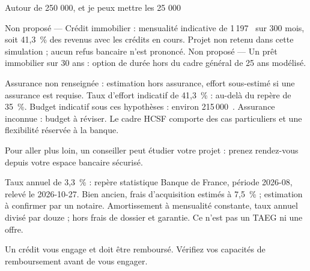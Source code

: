 \documentclass[11pt,a4paper]{article}
\begin{document}
\begin{client}Autour de 250 000, et je peux mettre les 25 000\end{client}
\begin{assistant}Non proposé — Crédit immobilier : mensualité indicative de 1\,197~\texteuro{} sur 300 mois, soit 41,3~\% des revenus avec les crédits en cours. Projet non retenu dans cette simulation ; aucun refus bancaire n'est prononcé. Non proposé — Un prêt immobilier sur 30 ans : option de durée hors du cadre général de 25 ans modélisé.\par Assurance non renseignée : estimation hors assurance, effort sous-estimé si une assurance est requise. Taux d'effort indicatif de 41,3~\% : au-delà du repère de 35~\%. Budget indicatif sous ces hypothèses : environ 215\,000~\texteuro{}. Assurance inconnue : budget à réviser. Le cadre HCSF comporte des cas particuliers et une flexibilité réservée à la banque.\par Pour aller plus loin, un conseiller peut étudier votre projet : prenez rendez-vous depuis votre espace bancaire sécurisé.\par Taux annuel de 3,3~\% : repère statistique Banque de France, période 2026-08, relevé le 2026-10-27. Bien ancien, frais d'acquisition estimés à 7,5~\% ; estimation à confirmer par un notaire. Amortissement à mensualité constante, taux annuel divisé par douze ; hors frais de dossier et garantie. Ce n'est pas un TAEG ni une offre.\par Un crédit vous engage et doit être remboursé. Vérifiez vos capacités de remboursement avant de vous engager.\end{assistant}
\end{document}
